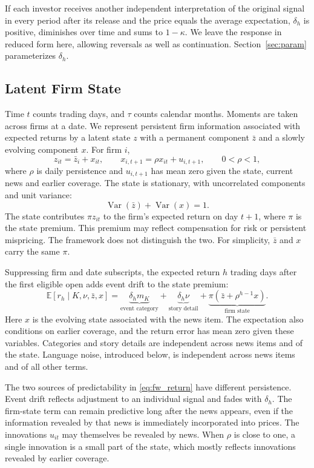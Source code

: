 \documentclass[11pt,letterpaper]{article}
\let\oldsubsection\subsection
\renewcommand{\subsection}{\FloatBarrier\oldsubsection}
\theoremstyle{remark}
\DeclareMathOperator{\Var}{Var}
\begin{document}
If each investor receives another independent interpretation of the original signal in every period after its release and the price equals the average expectation, $\delta_h$ is positive, diminishes over time and sums to $1-\kappa$. We leave the response in reduced form here, allowing reversals as well as continuation. Section~\ref{sec:param} parameterizes $\delta_h$.

\subsection{Latent Firm State}

Time $t$ counts trading days, and $\tau$ counts calendar months. Moments are taken across firms at a date. We represent persistent firm information associated with expected returns by a latent state $z$ with a permanent component $\bar z$ and a slowly evolving component $x$. For firm $i$,
\[
z_{it}=\bar z_i+x_{it},
\qquad
x_{i,t+1}=\rho x_{it}+u_{i,t+1},
\qquad
0<\rho<1,
\]
where $\rho$ is daily persistence and $u_{i,t+1}$ has mean zero given the state, current news and earlier coverage. The state is stationary, with uncorrelated components and unit variance:
\[
\Var(\bar z)+\Var(x)=1.
\]
The state contributes $\pi z_{it}$ to the firm's expected return on day $t+1$, where $\pi$ is the state premium. This premium may reflect compensation for risk or persistent mispricing. The framework does not distinguish the two. For simplicity, $\bar z$ and $x$ carry the same $\pi$.

Suppressing firm and date subscripts, the expected return $h$ trading days after the first eligible open adds event drift to the state premium:
\begin{equation}\label{eq:fw_return}
\mathbb E[r_h\mid K,\nu,\bar z,x]
=
\underbrace{\delta_hm_K}_{\text{event category}}
+
\underbrace{\delta_h\nu}_{\text{story detail}}
+
\underbrace{\pi\left(\bar z+\rho^{h-1}x\right)}_{\text{firm state}}.
\end{equation}
Here $x$ is the evolving state associated with the news item. The expectation also conditions on earlier coverage, and the return error has mean zero given these variables. Categories and story details are independent across news items and of the state. Language noise, introduced below, is independent across news items and of all other terms.

The two sources of predictability in \eqref{eq:fw_return} have different persistence. Event drift reflects adjustment to an individual signal and fades with $\delta_h$. The firm-state term can remain predictive long after the news appears, even if the information revealed by that news is immediately incorporated into prices. The innovations $u_{it}$ may themselves be revealed by news. When $\rho$ is close to one, a single innovation is a small part of the state, which mostly reflects innovations revealed by earlier coverage.
\end{document}
